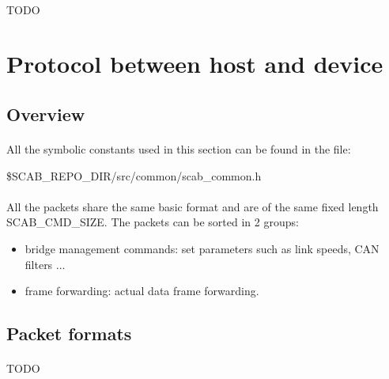 \documentclass[a4paper, 11pt]{article}
\begin{document}
\paragraph{}
TODO

\newpage
\section{Protocol between host and device}

\subsection{Overview}
\paragraph{}
All the symbolic constants used in this section can be found in the file:
\begin{center}
\$SCAB\_REPO\_DIR/src/common/scab\_common.h
\end{center}

\paragraph{}
All the packets share the same basic format and are of the same fixed length
SCAB\_CMD\_SIZE. The packets can be sorted in 2 groups:
\begin{itemize}
\item bridge management commands: set parameters such as link speeds, CAN filters ...
\item frame forwarding: actual data frame forwarding.
\end{itemize}

\subsection{Packet formats}
\paragraph{}
TODO
\end{document}
